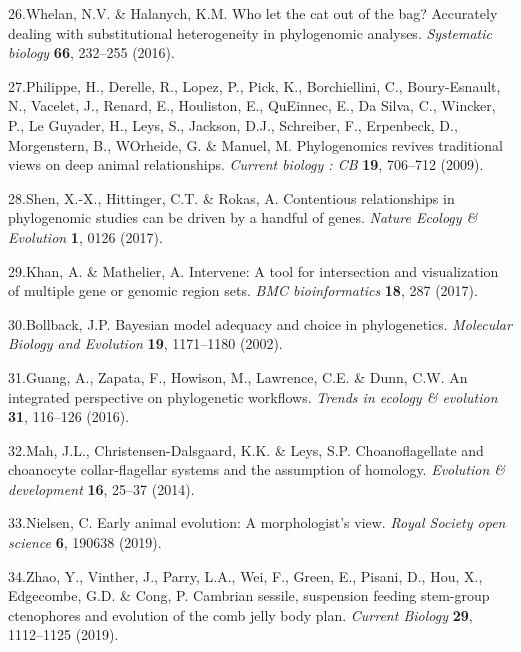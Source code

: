 \documentclass[]{article}
\begin{document}
\leavevmode\hypertarget{ref-whelan2016let}{}%
26.Whelan, N.V. \& Halanych, K.M. Who let the cat out of the bag?
Accurately dealing with substitutional heterogeneity in phylogenomic
analyses. \emph{Systematic biology} \textbf{66}, 232--255 (2016).

\leavevmode\hypertarget{ref-Philippe:2009hh}{}%
27.Philippe, H., Derelle, R., Lopez, P., Pick, K., Borchiellini, C.,
Boury-Esnault, N., Vacelet, J., Renard, E., Houliston, E., QuEinnec, E.,
Da Silva, C., Wincker, P., Le Guyader, H., Leys, S., Jackson, D.J.,
Schreiber, F., Erpenbeck, D., Morgenstern, B., WOrheide, G. \& Manuel,
M. Phylogenomics revives traditional views on deep animal relationships.
\emph{Current biology : CB} \textbf{19}, 706--712 (2009).

\leavevmode\hypertarget{ref-shen2017contentious}{}%
28.Shen, X.-X., Hittinger, C.T. \& Rokas, A. Contentious relationships
in phylogenomic studies can be driven by a handful of genes.
\emph{Nature Ecology \& Evolution} \textbf{1}, 0126 (2017).

\leavevmode\hypertarget{ref-khan2017intervene}{}%
29.Khan, A. \& Mathelier, A. Intervene: A tool for intersection and
visualization of multiple gene or genomic region sets. \emph{BMC
bioinformatics} \textbf{18}, 287 (2017).

\leavevmode\hypertarget{ref-Bollback:2002to}{}%
30.Bollback, J.P. Bayesian model adequacy and choice in phylogenetics.
\emph{Molecular Biology and Evolution} \textbf{19}, 1171--1180 (2002).

\leavevmode\hypertarget{ref-guang2016integrated}{}%
31.Guang, A., Zapata, F., Howison, M., Lawrence, C.E. \& Dunn, C.W. An
integrated perspective on phylogenetic workflows. \emph{Trends in
ecology \& evolution} \textbf{31}, 116--126 (2016).

\leavevmode\hypertarget{ref-mah2014choanoflagellate}{}%
32.Mah, J.L., Christensen-Dalsgaard, K.K. \& Leys, S.P. Choanoflagellate
and choanocyte collar-flagellar systems and the assumption of homology.
\emph{Evolution \& development} \textbf{16}, 25--37 (2014).

\leavevmode\hypertarget{ref-nielsen2019early}{}%
33.Nielsen, C. Early animal evolution: A morphologist's view.
\emph{Royal Society open science} \textbf{6}, 190638 (2019).

\leavevmode\hypertarget{ref-zhao2019cambrian}{}%
34.Zhao, Y., Vinther, J., Parry, L.A., Wei, F., Green, E., Pisani, D.,
Hou, X., Edgecombe, G.D. \& Cong, P. Cambrian sessile, suspension
feeding stem-group ctenophores and evolution of the comb jelly body
plan. \emph{Current Biology} \textbf{29}, 1112--1125 (2019).
\end{document}
